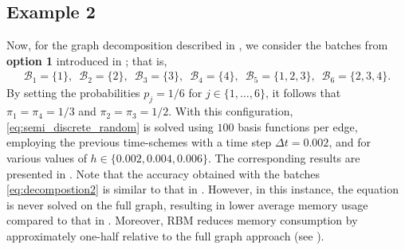 \documentclass[a4paper, 10pt, english]{article}
\begin{document}
\subsection{Example 2}
Now, for the graph decomposition described in , we consider the batches from {\bf option 1} introduced in ; that is,
\begin{align}\label{eq:decompostion2}
    \mathcal{B}_1 =\{1\},\,\,\, \mathcal{B}_2 =\{2\},\,\, \,\mathcal{B}_3 =\{3\},\,\,\, \mathcal{B}_4 =\{4\},\,\,\, \mathcal{B}_5 =\{1,2,3\},\,\,\, \mathcal{B}_6 =\{2,3,4\}.
\end{align}
By setting the probabilities $p_j=1/6$ for $j\in\{1,\dots,6\}$, it follows that $\pi_1=\pi_4=1/3$ and $\pi_2=\pi_3=1/2$. With this configuration, \eqref{eq:semi_discrete_random} is solved using $100$ basis functions per edge, employing the previous time-schemes with a time step $\Delta t =0.002$, and for various values of $h\in\{0.002,0.004,0.006\}$. The corresponding results are presented in . Note that the accuracy obtained with the batches \eqref{eq:decompostion2} is similar to that in . However, in this instance, the equation is never solved on the full graph, resulting in lower average memory usage compared to that in . Moreover, RBM reduces memory consumption by approximately one-half relative to the full graph approach (see ).
\begin{table}[htbp]
\centering
\caption{Performance RBM with IE and CN, using decomposition \eqref{eq:decompostion2}.}\label{table:rbm_dec2}
\end{table}
\end{document}
